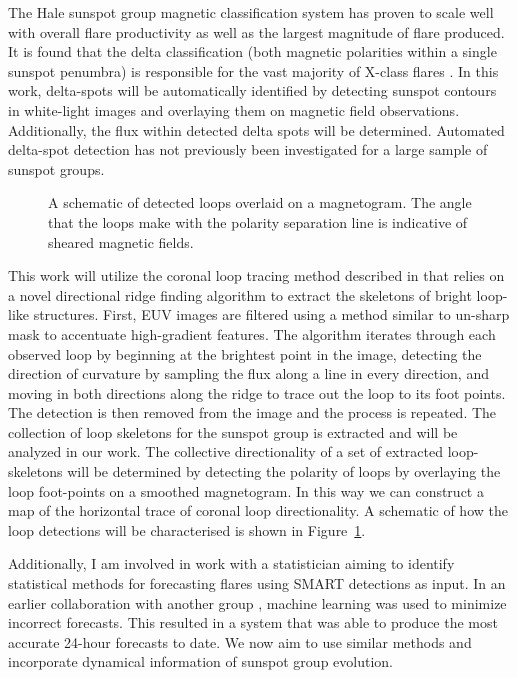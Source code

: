 The Hale sunspot group magnetic classification system has proven to scale well with overall flare productivity \citep{Kunzel:1960} as well as the largest magnitude of flare produced. It is found that the delta classification (both magnetic polarities within a single sunspot penumbra)  is responsible for the vast majority of X-class flares \citep{sammis:2000}. In this work, delta-spots will be automatically identified by detecting sunspot contours in white-light images and overlaying them on magnetic field observations. Additionally, the flux within detected delta spots will be determined. Automated delta-spot detection has not previously been investigated for a large sample of sunspot groups.

\begin{figure}[!t]
\caption[A schematic of detected loops overlaid on a magnetogram.]{A schematic of detected loops overlaid on a magnetogram. The angle that the loops make with the polarity separation line is indicative of sheared magnetic fields.}
\label{fig: loopschem}
\end{figure}

This work will utilize the coronal loop tracing method described in \cite{Aschwanden:2010} that relies on a novel directional ridge finding algorithm to extract the skeletons of bright loop-like structures. First, EUV images are filtered using a method similar to un-sharp mask to accentuate high-gradient features. The algorithm iterates through each observed loop by beginning at the brightest point in the image, detecting the direction of curvature by sampling the flux along a line in every direction, and moving in both directions along the ridge to trace out the loop to its foot points. The detection is then removed from the image and the process is repeated. The collection of loop skeletons for the sunspot group is extracted and will be analyzed in our work. The collective directionality of a set of extracted loop-skeletons will be determined by detecting the polarity of loops by overlaying the loop foot-points on a smoothed magnetogram. In this way we can construct a map of the horizontal trace of coronal loop directionality. A schematic of how the loop detections will be characterised is shown in Figure~\ref{fig: loopschem}. 

Additionally, I am involved in work with a statistician aiming to identify statistical methods for forecasting flares using \gls{SMART} detections as input. In an earlier collaboration with another group \citep{Ahmed:2011}, machine learning was used to minimize incorrect forecasts. This resulted in a system that was able to produce the most accurate 24-hour forecasts to date. We now aim to use similar methods and incorporate dynamical information of sunspot group evolution.

